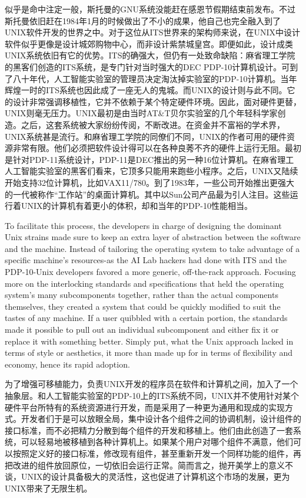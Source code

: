 \ifdefined\chs
似乎是命中注定一般，斯托曼的GNU系统没能赶在感恩节假期结束前发布。不过斯托曼依旧赶在1984年1月的时候做出了不小的成果，他自己也完全融入到了UNIX软件开发的世界之中。对于这位从ITS世界来的架构师来说，在UNIX中设计软件似乎更像是设计城郊购物中心，而非设计紫禁城皇宫。即便如此，设计成类UNIX系统依旧有它的优势。ITS的确强大，但仍有一处致命缺陷：麻省理工学院的黑客们创造的ITS系统，是专门针对当时强大的DEC PDP-10计算机设计。可到了八十年代，人工智能实验室的管理员决定淘汰掉实验室的PDP-10计算机。当年辉煌一时的ITS系统也因此成了一座无人的鬼城。而UNIX的设计则与此不同。它的设计非常强调移植性，它并不依赖于某个特定硬件环境。因此，面对硬件更替，UNIX则毫无压力。UNIX最初是由当时AT\&T贝尔实验室的几个年轻科学家创造。之后，这套系统被大家纷纷传阅，不断改进。在资金并不富裕的学术界，UNIX系统甚是流行。和麻省理工学院的同僚们不同，UNIX的作者可用的硬件资源非常有限。他们必须把软件设计得可以在各种良莠不齐的硬件上运行无阻。最初是针对PDP-11系统设计，PDP-11是DEC推出的另一种16位计算机。在麻省理工人工智能实验室的黑客们看来，它顶多只能用来跑些小程序。之后，UNIX又陆续开始支持32位计算机，比如VAX11/780。到了1983年，一些公司开始推出更强大的一代被称作``工作站''的桌面计算机。其中以Sun公司产品最为引人注目。这些运行着UNIX的计算机有着更小的体积，却和当年的PDP-10性能相当。
\fi

\ifdefined\vone
\ifdefined\eng
To facilitate this process, the developers in charge of designing the dominant Unix strains made sure to keep an extra layer of abstraction between the software and the machine. Instead of tailoring the operating system to take advantage of a specific machine's resources-as the AI Lab hackers had done with ITS and the PDP-10-Unix developers favored a more generic, off-the-rack approach. Focusing more on the interlocking standards and specifications that held the operating system's many subcomponents together, rather than the actual components themselves, they created a system that could be quickly modified to suit the tastes of any machine. If a user quibbled with a certain portion, the standards made it possible to pull out an individual subcomponent and either fix it or replace it with something better. Simply put, what the Unix approach lacked in terms of style or aesthetics, it more than made up for in terms of flexibility and economy, hence its rapid adoption.
\fi

\ifdefined\chs
为了增强可移植能力，负责UNIX开发的程序员在软件和计算机之间，加入了一个抽象层。和人工智能实验室的PDP-10上的ITS系统不同，UNIX并不使用针对某个硬件平台所特有的系统资源进行开发，而是采用了一种更为通用和现成的实现方式。开发者们于是可以放眼全局，集中设计各个组件之间的协调机制，设计组件的接口标准，而不必把精力分散到每个组件的开发和移植上。他们由此创造了一套系统，可以轻易地被移植到各种计算机上。如果某个用户对哪个组件不满意，他们可以按照定义好的接口标准，修改现有组件，甚至重新开发一个同样功能的组件，再把改进的组件放回原位，一切依旧会运行正常。简而言之，抛开美学上的意义不谈，UNIX的设计具备极大的灵活性，这也促进了计算机这个市场的发展，更为UNIX带来了无限生机。
\fi

